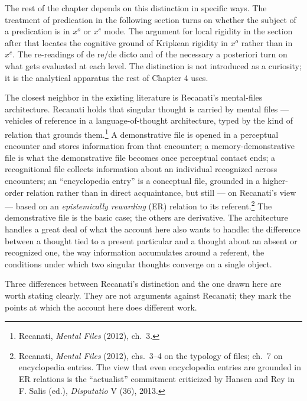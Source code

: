 \documentclass[10pt]{article}
\begin{document}
The rest of the chapter depends on this distinction in specific ways. The treatment of predication in the following section turns on whether the subject of a predication is in \(x^o\) or \(x^c\) mode. The argument for local rigidity in the section after that locates the cognitive ground of Kripkean rigidity in \(x^o\) rather than in \(x^c\). The re-readings of de re/de dicto and of the necessary a posteriori turn on what gets evaluated at each level. The distinction is not introduced as a curiosity; it is the analytical apparatus the rest of Chapter 4 uses.

The closest neighbor in the existing literature is Recanati's mental-files architecture. Recanati holds that singular thought is carried by mental files --- vehicles of reference in a language-of-thought architecture, typed by the kind of relation that grounds them.\footnote{Recanati, \emph{Mental Files} (2012), ch.~3.} A demonstrative file is opened in a perceptual encounter and stores information from that encounter; a memory-demonstrative file is what the demonstrative file becomes once perceptual contact ends; a recognitional file collects information about an individual recognized across encounters; an ``encyclopedia entry'' is a conceptual file, grounded in a higher-order relation rather than in direct acquaintance, but still --- on Recanati's view --- based on an \emph{epistemically rewarding} (ER) relation to its referent.\footnote{Recanati, \emph{Mental Files} (2012), chs.~3--4 on the typology of files; ch.~7 on encyclopedia entries. The view that even encyclopedia entries are grounded in ER relations is the ``actualist'' commitment criticized by Hansen and Rey in F. Salis (ed.), \emph{Disputatio} V (36), 2013.} The demonstrative file is the basic case; the others are derivative. The architecture handles a great deal of what the account here also wants to handle: the difference between a thought tied to a present particular and a thought about an absent or recognized one, the way information accumulates around a referent, the conditions under which two singular thoughts converge on a single object.

Three differences between Recanati's distinction and the one drawn here are worth stating clearly. They are not arguments against Recanati; they mark the points at which the account here does different work.
\end{document}
